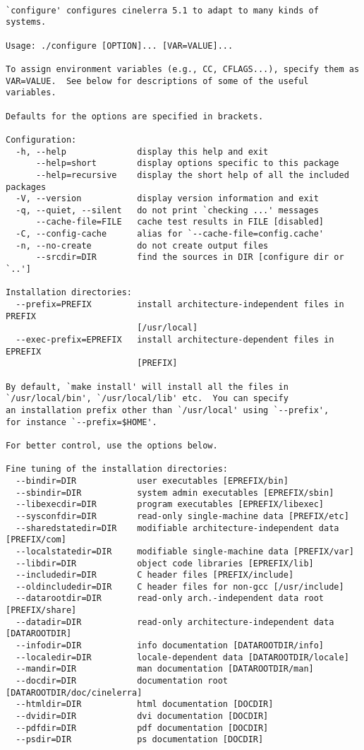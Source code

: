 \begingroup
    \fontsize{10pt}{12pt}\selectfont
\begin{verbatim}

`configure' configures cinelerra 5.1 to adapt to many kinds of systems.

Usage: ./configure [OPTION]... [VAR=VALUE]...

To assign environment variables (e.g., CC, CFLAGS...), specify them as
VAR=VALUE.  See below for descriptions of some of the useful variables.

Defaults for the options are specified in brackets.

Configuration:
  -h, --help              display this help and exit
      --help=short        display options specific to this package
      --help=recursive    display the short help of all the included packages
  -V, --version           display version information and exit
  -q, --quiet, --silent   do not print `checking ...' messages
      --cache-file=FILE   cache test results in FILE [disabled]
  -C, --config-cache      alias for `--cache-file=config.cache'
  -n, --no-create         do not create output files
      --srcdir=DIR        find the sources in DIR [configure dir or `..']

Installation directories:
  --prefix=PREFIX         install architecture-independent files in PREFIX
                          [/usr/local]
  --exec-prefix=EPREFIX   install architecture-dependent files in EPREFIX
                          [PREFIX]

By default, `make install' will install all the files in
`/usr/local/bin', `/usr/local/lib' etc.  You can specify
an installation prefix other than `/usr/local' using `--prefix',
for instance `--prefix=$HOME'.

For better control, use the options below.

Fine tuning of the installation directories:
  --bindir=DIR            user executables [EPREFIX/bin]
  --sbindir=DIR           system admin executables [EPREFIX/sbin]
  --libexecdir=DIR        program executables [EPREFIX/libexec]
  --sysconfdir=DIR        read-only single-machine data [PREFIX/etc]
  --sharedstatedir=DIR    modifiable architecture-independent data [PREFIX/com]
  --localstatedir=DIR     modifiable single-machine data [PREFIX/var]
  --libdir=DIR            object code libraries [EPREFIX/lib]
  --includedir=DIR        C header files [PREFIX/include]
  --oldincludedir=DIR     C header files for non-gcc [/usr/include]
  --datarootdir=DIR       read-only arch.-independent data root [PREFIX/share]
  --datadir=DIR           read-only architecture-independent data [DATAROOTDIR]
  --infodir=DIR           info documentation [DATAROOTDIR/info]
  --localedir=DIR         locale-dependent data [DATAROOTDIR/locale]
  --mandir=DIR            man documentation [DATAROOTDIR/man]
  --docdir=DIR            documentation root [DATAROOTDIR/doc/cinelerra]
  --htmldir=DIR           html documentation [DOCDIR]
  --dvidir=DIR            dvi documentation [DOCDIR]
  --pdfdir=DIR            pdf documentation [DOCDIR]
  --psdir=DIR             ps documentation [DOCDIR]


\end{verbatim}
